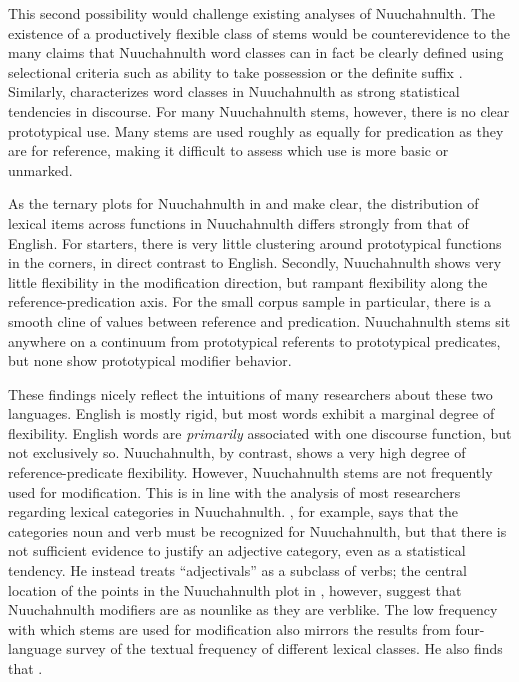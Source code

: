 This second possibility would challenge existing analyses of Nuuchahnulth. The existence of a productively flexible class of stems would be counterevidence to the many claims that Nuuchahnulth word classes can in fact be clearly defined using selectional criteria such as ability to take possession or the definite suffix . Similarly, \textcite[57]{Nakayama2001} characterizes word classes in Nuuchahnulth as strong statistical tendencies in discourse. For many Nuuchahnulth stems, however, there is no clear prototypical use. Many stems are used roughly as equally for predication as they are for reference, making it difficult to assess which use is more basic or unmarked.

As the ternary plots for Nuuchahnulth in  and  make clear, the distribution of lexical items across functions in Nuuchahnulth differs strongly from that of English. For starters, there is very little clustering around prototypical functions in the corners, in direct contrast to English. Secondly, Nuuchahnulth shows very little flexibility in the modification direction, but rampant flexibility along the reference-predication axis. For the small corpus sample in particular, there is a smooth cline of values between reference and predication. Nuuchahnulth stems sit anywhere on a continuum from prototypical referents to prototypical predicates, but none show prototypical modifier behavior.

These findings nicely reflect the intuitions of many researchers about these two languages. English is mostly rigid, but most words exhibit a marginal degree of flexibility. English words are \emph{primarily} associated with one discourse function, but not exclusively so. Nuuchahnulth, by contrast, shows a very high degree of reference-predicate flexibility. However, Nuuchahnulth stems are not frequently used for modification. This is in line with the analysis of most researchers regarding lexical categories in Nuuchahnulth. \textcite[50]{Nakayama2001}, for example, says that the categories noun and verb must be recognized for Nuuchahnulth, but that there is not sufficient evidence to justify an adjective category, even as a statistical tendency. He instead treats \enquote{adjectivals} as a subclass of verbs; the central location of the points in the Nuuchahnulth plot in , however, suggest that Nuuchahnulth modifiers are as nounlike as they are verblike. The low frequency with which stems are used for modification also mirrors the results from  four-language survey of the textual frequency of different lexical classes. He also finds that .

